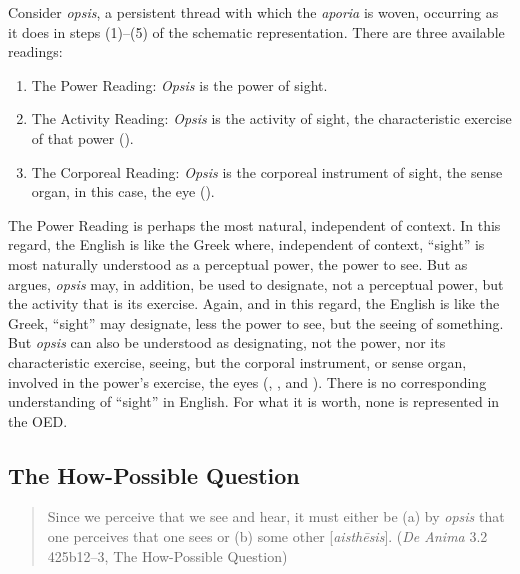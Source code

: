 Consider \emph{opsis}, a persistent thread with which the \emph{aporia} is woven, occurring as it does in steps (1)–(5) of the schematic representation. There are three available readings:
\begin{enumerate}[(1)]
	\item The Power Reading: \emph{Opsis} is the power of sight.
	\item The Activity Reading: \emph{Opsis} is the activity of sight, the characteristic exercise of that power (\citealt{caston02}).
	\item The Corporeal Reading: \emph{Opsis} is the corporeal instrument of sight, the sense organ, in this case, the eye (\citealt{Trubowitz:2025aa}).
\end{enumerate}
The Power Reading is perhaps the most natural, independent of context. In this regard, the English is like the Greek where, independent of context, ``sight'' is most naturally understood as a perceptual power, the power to see. But as \citet{caston02} argues, \emph{opsis} may, in addition, be used to designate, not a perceptual power, but the activity that is its exercise. Again, and in this regard, the English is like the Greek, ``sight'' may designate, less the power to see, but the seeing of something. But \emph{opsis} can also be understood as designating, not the power, nor its characteristic exercise, seeing, but the corporal instrument, or sense organ, involved in the power's exercise, the eyes (\citealt[]{Bonitz:1870aa}, \citealt[]{Hicks:1907uq}, and \citealt{Trubowitz:2025aa}). There is no corresponding understanding of ``sight'' in English. For what it is worth, none is represented in the OED.



\subsection{The How-Possible Question} %
\label{sub:the_how_possible_question}

\begin{quote}
	Since we perceive that we see and hear, it must either be (a) by \emph{opsis} that one perceives that one sees or (b) some other [\emph{aisthēsis}]. (\emph{De Anima} 3.2 425b12–3, The How-Possible Question)
\end{quote}

